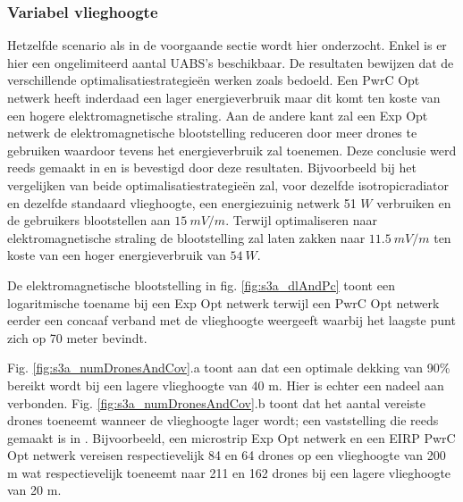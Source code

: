 \documentclass[twocolumn]{phdsymp_dutch}
\begin{document}
\subsubsection{Variabel vlieghoogte}
Hetzelfde scenario als in de voorgaande sectie wordt hier onderzocht. Enkel is er hier een ongelimiteerd aantal 
\gls{UABS}'s beschikbaar. De resultaten bewijzen dat de verschillende optimalisatiestrategie\"en werken zoals bedoeld.
Een \gls{PwrC Opt} netwerk heeft inderdaad een lager energieverbruik maar dit komt ten koste van een hogere elektromagnetische straling.
Aan de andere kant zal een  \gls{Exp Opt} netwerk de elektromagnetische blootstelling reduceren door meer drones te gebruiken waardoor tevens 
het energieverbruik zal toenemen. Deze conclusie werd reeds gemaakt in \cite{J1} en is bevestigd door deze resultaten.
Bijvoorbeeld bij het vergelijken van beide optimalisatiestrategieën zal, voor dezelfde
\gls{isotropicradiator} en dezelfde standaard vlieghoogte, een energiezuinig netwerk 51 $W$ verbruiken
en de gebruikers blootstellen aan $15\ mV/m$.
Terwijl optimaliseren naar elektromagnetische straling de blootstelling zal laten zakken naar 
$11.5\ mV/m$ ten koste van een hoger energieverbruik van $54\ W$.

De elektromagnetische blootstelling in fig. \ref{fig:s3a_dlAndPc} toont een logaritmische toename bij een 
\gls{Exp Opt} netwerk terwijl een \gls{PwrC Opt} netwerk eerder een concaaf verband met de vlieghoogte weergeeft 
waarbij het laagste punt zich op 70 meter bevindt.

Fig. \ref{fig:s3a_numDronesAndCov}.a toont aan dat een optimale dekking van 90\% bereikt wordt bij een lagere vlieghoogte van 40 m.
Hier is echter een nadeel aan verbonden. 
Fig. \ref{fig:s3a_numDronesAndCov}.b 
toont dat het aantal vereiste drones toeneemt wanneer de vlieghoogte lager wordt; 
een vaststelling die reeds gemaakt is in \cite{J2}.
Bijvoorbeeld, een microstrip \gls{Exp Opt} netwerk en een \gls{EIRP} \gls{PwrC Opt} netwerk 
vereisen respectievelijk 84 en 64 drones op een vlieghoogte van 200 m wat respectievelijk toeneemt naar 
211 en 162 drones bij een lagere vlieghoogte van 20 m.
\end{document}
